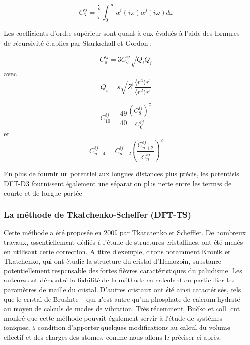 {	\bigskip
	\begin{equation}
	C_{6}^{ij} = \frac{3}{\pi}\int_{0}^{\infty} \alpha^{i} (i\omega) \alpha^{j} (i\omega) d\omega
	\end{equation}
	\bigskip
	
	Les coefficients d’ordre supérieur sont quant à eux évalués à l’aide des formules de récursivité établies par Starkschall et Gordon \cite{starkschall1972error} : 
	
		\begin{equation}{C}_{8}^{ij} = 3{C}_{6}^{ij}\sqrt {{Q}_{i}{Q}_{j}}\end{equation} avec
		\begin{equation}Q_{i} = s\sqrt{Z^{i}} \frac{\langle r^{4}\rangle r^{i}}{\langle r^{2}\rangle r^{i}}\end{equation}
	
	
	
		\begin{equation} {C}_{10}^{ij}=\frac {49}{40} \frac{{\left({C}_{8}^{ij} \right)}^{2}}{{C}_{6}^{ij}} \end{equation} et
		\begin{equation} {C}_{n+4}^{ij}={C}_{n-2}^{ij}{\left(\frac{ {C}_{n+2}^{ij} }{ {C}_{n}^{ij} }\right)}^{3} \end{equation}
	
	
	En plus de fournir un potentiel aux longues distances plus précis, les potentiels DFT-D3 fournissent également une séparation plus nette entre les termes de courte et de longue portée. 
	
	
	\subsubsection{La méthode de Tkatchenko-Scheffer (DFT-TS)}
	
	Cette méthode a été proposée en 2009 par Tkatchenko et Scheffler\cite{tkatchenko2009accurate}. De nombreux travaux, essentiellement dédiés à l’étude de structures cristallines, ont été menés en utilisant cette correction. A titre d'exemple, citons notamment Kronik et Tkatchenko\cite{kronik2014understanding}, qui ont étudié la structure du cristal d'Hemozoin, substance potentiellement responsable des fortes fièvres caractéristiques du paludisme. Les auteurs ont démontré la fiabilité de la méthode en calculant en particulier les paramètres de maille du cristal. D’autres cristaux ont été ainsi caractérisés, tels que le cristal de Brushite -- qui n’est autre qu’un phosphate de calcium hydraté -- au moyen de calculs de modes de vibration. Très récemment, Bu\u{c}ko et coll. \cite{buvcko2014extending} ont montré que cette méthode pouvait également servir à l’étude de systèmes ioniques, à condition d’apporter quelques modifications au calcul du volume effectif et des charges des atomes, comme nous allons le préciser ci-après. 
	
}
